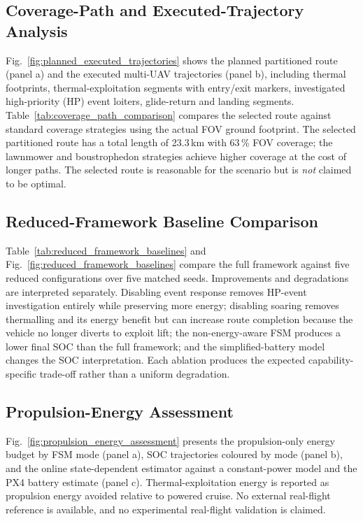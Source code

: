 \subsection{Coverage-Path and Executed-Trajectory Analysis}
Fig.~\ref{fig:planned_executed_trajectories} shows the planned partitioned route (panel a) and the executed multi-UAV trajectories (panel b), including thermal footprints, thermal-exploitation segments with entry/exit markers, investigated high-priority (HP) event loiters, glide-return and landing segments. Table~\ref{tab:coverage_path_comparison} compares the selected route against standard coverage strategies using the actual FOV ground footprint. The selected partitioned route has a total length of 23.3\,km with 63\,\% FOV coverage; the lawnmower and boustrophedon strategies achieve higher coverage at the cost of longer paths. The selected route is reasonable for the scenario but is \emph{not} claimed to be optimal.

\subsection{Reduced-Framework Baseline Comparison}
Table~\ref{tab:reduced_framework_baselines} and Fig.~\ref{fig:reduced_framework_baselines} compare the full framework against five reduced configurations over five matched seeds. Improvements and degradations are interpreted separately. Disabling event response removes HP-event investigation entirely while preserving more energy; disabling soaring removes thermalling and its energy benefit but can increase route completion because the vehicle no longer diverts to exploit lift; the non-energy-aware FSM produces a lower final SOC than the full framework; and the simplified-battery model changes the SOC interpretation. Each ablation produces the expected capability-specific trade-off rather than a uniform degradation.

\subsection{Propulsion-Energy Assessment}
Fig.~\ref{fig:propulsion_energy_assessment} presents the propulsion-only energy budget by FSM mode (panel a), SOC trajectories coloured by mode (panel b), and the online state-dependent estimator against a constant-power model and the PX4 battery estimate (panel c). Thermal-exploitation energy is reported as propulsion energy avoided relative to powered cruise. No external real-flight reference is available, and no experimental real-flight validation is claimed.

